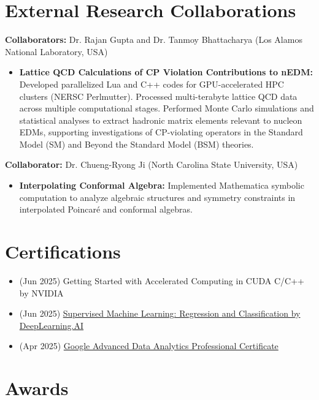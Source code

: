 \documentclass[11pt]{article}
\begin{document}
\section*{External Research Collaborations}
\vspace{-0.3em}
\textbf{Collaborators:} Dr. Rajan Gupta and Dr. Tanmoy Bhattacharya (Los Alamos National Laboratory, USA)
\begin{itemize}
    \item \textbf{Lattice QCD Calculations of CP Violation Contributions to nEDM:} Developed parallelized Lua and C++ codes for GPU-accelerated HPC clusters (NERSC Perlmutter). Processed multi-terabyte lattice QCD data across multiple computational stages. Performed Monte Carlo simulations and statistical analyses to extract hadronic matrix elements relevant to nucleon EDMs, supporting investigations of CP-violating operators in the Standard Model (SM) and Beyond the Standard Model (BSM) theories.
\end{itemize}

\textbf{Collaborator:} Dr. Chueng-Ryong Ji (North Carolina State University, USA)
\begin{itemize}
    \item \textbf{Interpolating Conformal Algebra:} Implemented Mathematica symbolic computation to analyze algebraic structures and symmetry constraints in interpolated Poincaré and conformal algebras.
\end{itemize}
%

\section*{Certifications}
\vspace{-0.3em}
\begin{itemize}
    \item (Jun 2025) Getting Started with Accelerated Computing in CUDA C/C++ by NVIDIA
    \item (Jun 2025) \href{https://coursera.org/share/b9cffe9c5ba5832ffb99bf7abdd8c384}{Supervised Machine Learning: Regression and Classification by DeepLearning.AI} 
    \item (Apr 2025) \href{https://www.coursera.org/account/accomplishments/professional-cert/certificate/U0HU8UKT89L4}{Google Advanced Data Analytics Professional Certificate} 
\end{itemize}


\section*{Awards}
\vspace{-0.3em}
\end{document}
